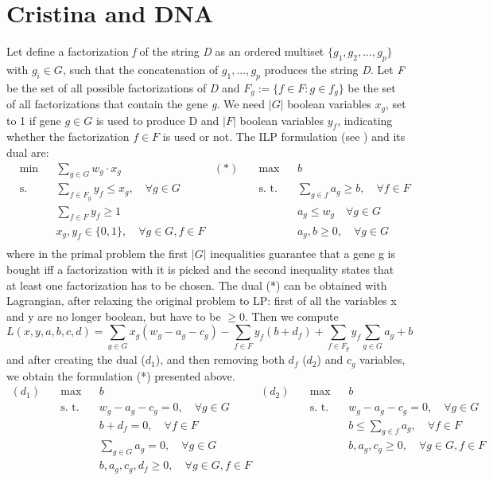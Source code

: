 \section{Cristina and DNA}
Let define a factorization \textit{f} of the string \textit{D} as an ordered multiset $\{g_1, g_2, ..., g_p\}$ with $g_i \in G$, such that the concatenation of $g_1, ..., g_p$ produces the string \textit{D}. Let \textit{F} be the set of all possible factorizations of \textit{D} and $F_g:= \{f \in F : g \in f_g\}$ be the set of all factorizations that contain the gene \textit{g}. We need $|G|$ boolean variables $x_g$, set to 1 if gene $g \in G$ is used to produce D and $|F|$ boolean variables $y_f$, indicating whether the factorization $f \in F$ is used or not. The ILP formulation (see \cite{String cover}) and its dual are:
\begin{align*}
&\text{min} && \sum_{g \in G} w_g \cdot x_g & (*) \quad & \text{max}&& b  \\
&\text{s. t.} && \sum_{f \in F_g} y_f \leq x_g, \quad \forall g \in G &&\text{s. t.} && \sum_{g \in f} a_g \geq b, \quad \forall f \in F \\
&&& \sum_{f \in F} y_f \geq 1 &&&&  a_g \leq w_g \quad \forall g \in G\\
&&& x_g,y_f \in \{0,1\}, \quad \forall g \in G, f \in F &&&& a_g,b \geq 0, \quad \forall g \in G\\
\end{align*}
where in the primal problem the first $|G|$ inequalities guarantee that a gene g is bought iff a factorization with it is picked and the second inequality states that at least one factorization has to be chosen. The dual (*) can be obtained with Lagrangian, after relaxing the original problem to LP: first of all the variables x and y are no longer boolean, but have to be $\geq 0$. Then we compute
\[
L(x,y,a,b,c,d) = \sum_{g \in G} x_g (w_g - a_g - c_g) - \sum_{f \in F} y_f (b + d_f) + \sum_{f \in F_g} y_f\sum_{g \in G} a_g + b
\]
and after creating the dual ($d_1$), and then removing both $d_f$ ($d_2$) and $c_g$ variables, we obtain the formulation (*) presented above.
\begin{align*}
(d_1) \quad&\text{max} && b & (d_2)\quad& \text{max}&& b  \\
&\text{s. t.} && w_g -a_g-c_g = 0, \quad \forall g \in G &&\text{s. t.} && w_g - a_g -c_g = 0, \quad \forall g \in G \\
&&& b +d_f = 0, \quad \forall f \in F &&&&  b \leq \sum_{g \in f} a_g, \quad \forall f \in F\\
&&&\sum_{g \in G} a_g = 0, \quad \forall g \in G &&&& b,a_g,c_g \geq 0, \quad \forall g \in G, f \in F\\
&&& b,a_g,c_g,d_f \geq 0, \quad \forall g \in G, f \in F  &&&&\\
\end{align*}
